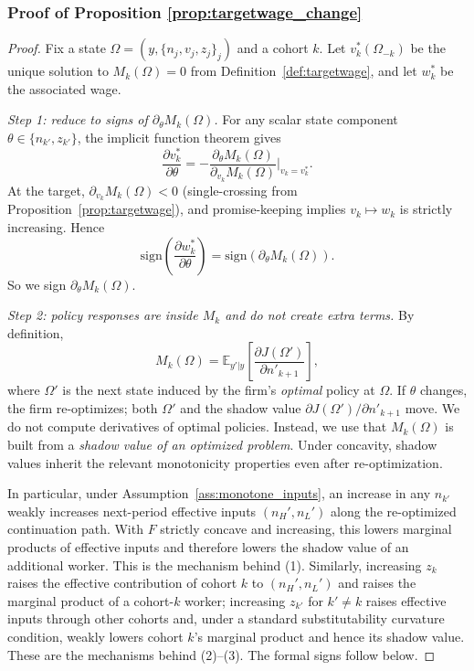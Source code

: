 \subsubsection*{Proof of Proposition \ref{prop:targetwage_change}}\label{proof:targetwage_change}
\begin{proof}
Fix a state $\Omega=(y,\{n_j,v_j,z_j\}_j)$ and a cohort $k$.
Let $v_k^*(\Omega_{-k})$ be the unique solution to $M_k(\Omega)=0$ from Definition~\ref{def:targetwage}, and let $w_k^*$ be the
associated wage.

\medskip
\noindent\textit{Step 1: reduce to signs of $\partial_\theta M_k(\Omega)$.}
For any scalar state component $\theta\in\{n_{k'},z_{k'}\}$, the implicit function theorem gives
\[
\frac{\partial v_k^*}{\partial \theta}
=
-\frac{\partial_\theta M_k(\Omega)}{\partial_{v_k} M_k(\Omega)}\bigg|_{v_k=v_k^*}.
\]
At the target, $\partial_{v_k}M_k(\Omega)<0$ (single-crossing from Proposition~\ref{prop:targetwage}), and promise-keeping implies
$v_k\mapsto w_k$ is strictly increasing. Hence
\[
\mathrm{sign}\!\left(\frac{\partial w_k^*}{\partial \theta}\right)
=
\mathrm{sign}\!\left(\partial_\theta M_k(\Omega)\right).
\]
So we sign $\partial_\theta M_k(\Omega)$.

\medskip
\noindent\textit{Step 2: policy responses are inside $M_k$ and do not create extra terms.}
By definition,
\[
M_k(\Omega)=\mathbb E_{y'|y}\left[\frac{\partial J(\Omega')}{\partial n'_{k+1}}\right],
\]
where $\Omega'$ is the next state induced by the firm's \emph{optimal} policy at $\Omega$.
If $\theta$ changes, the firm re-optimizes; both $\Omega'$ and the shadow value $\partial J(\Omega')/\partial n'_{k+1}$ move.
We do not compute derivatives of optimal policies. Instead, we use that $M_k(\Omega)$ is built from a \emph{shadow value of an
optimized problem}. Under concavity, shadow values inherit the relevant monotonicity properties even after re-optimization.

In particular, under Assumption~\ref{ass:monotone_inputs}, an increase in any $n_{k'}$ weakly increases next-period effective inputs
$(n_H',n_L')$ along the re-optimized continuation path. With $F$ strictly concave and increasing, this lowers marginal products of
effective inputs and therefore lowers the shadow value of an additional worker. This is the mechanism behind (1).
Similarly, increasing $z_k$ raises the effective contribution of cohort $k$ to $(n_H',n_L')$ and raises the marginal product of a
cohort-$k$ worker; increasing $z_{k'}$ for $k'\neq k$ raises effective inputs through other cohorts and, under a standard
substitutability curvature condition, weakly lowers cohort $k$'s marginal product and hence its shadow value. These are the
mechanisms behind (2)--(3). The formal signs follow below.


\end{proof}
